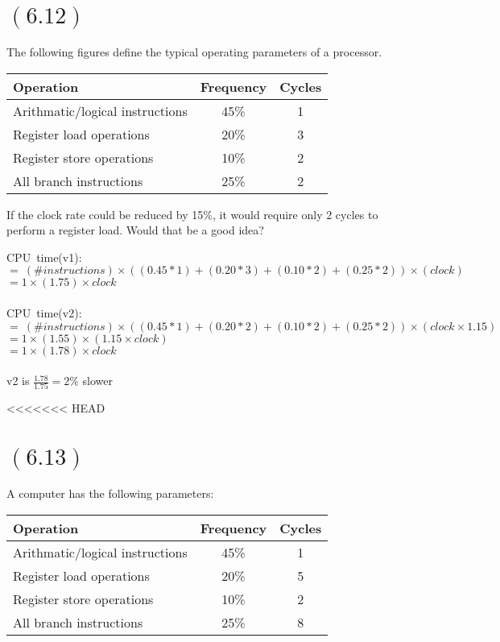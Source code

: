 \documentclass[letterpaper,12pt,titlepage]{article}
\begin{document}
\section*{$(6.12)$} The following figures define the typical operating parameters of a processor.\\
\begin{center}
\begin{tabular}{l | c | c}
\textbf{Operation} & \textbf{Frequency} & \textbf{Cycles}\\ \hline
Arithmatic/logical instructions& 45\% & 1\\
Register load operations& 20\% & 3\\
Register store operations& 10\% & 2\\
All branch instructions& 25\% & 2 \\
\end{tabular}
\end{center}

If the clock rate could be reduced by 15\%, it would require only 2 cycles to perform a register load. Would that be a good idea?
\begin{mdframed}[style=MyFrame]

CPU~time(v1):\\
$=~(\# instructions)\times ((0.45*1)+(0.20*3)+(0.10*2)+(0.25*2))\times (clock)$\\
$=1\times(1.75)\times clock$ \\ \\
CPU~time(v2):\\
$=~(\# instructions)\times ((0.45*1)+(0.20*2)+(0.10*2)+(0.25*2))\times (clock \times 1.15)$\\
$=1\times(1.55)\times (1.15\times clock)$ \\
$=1\times(1.78)\times clock$ \\ \\
v2 is $\frac{1.78}{1.75} = 2\% $ slower
\end{mdframed}

<<<<<<< HEAD
\section*{$(6.13)$} A computer has the following parameters:\\
\begin{center}
\begin{tabular}{l | c | c}
\textbf{Operation} & \textbf{Frequency} & \textbf{Cycles}\\ \hline
Arithmatic/logical instructions& 45\% & 1\\
Register load operations& 20\% & 5\\
Register store operations& 10\% & 2\\
All branch instructions& 25\% & 8 \\
\end{tabular}
\end{center}
\end{document}
